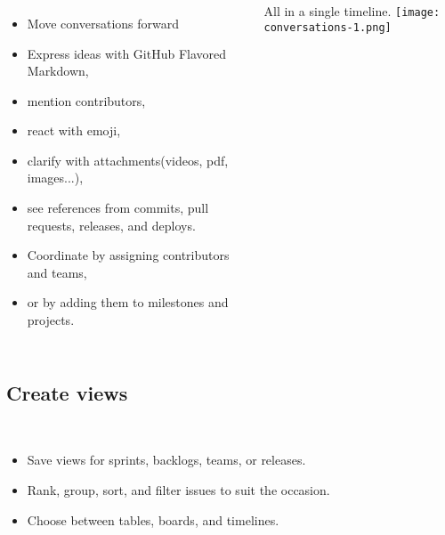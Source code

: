\begin{frame}
  \frametitle{\insertsectionhead}
  \framesubtitle{\insertsubsectionhead}
  \begin{columns}
    \scriptsize
    \begin{itemize}
      \item Move conversations forward
      \item Express ideas with GitHub Flavored Markdown, 
      \item mention contributors, 
      \item react with emoji, 
      \item clarify with attachments(videos, pdf, images...), 
      \item see references from commits, pull requests, releases, and deploys. 
      \item Coordinate by assigning contributors and teams, 
      \item or by adding them to milestones and projects. 
    \end{itemize}
    \centering\vspace{1cm}
    \alert{All in a single timeline.}
    \texttt{[image: conversations-1.png]}
  \end{columns}

\end{frame}

\subsection{Create views}
\begin{frame}
  \frametitle{\insertsectionhead}
  \framesubtitle{\insertsubsectionhead}
  \begin{columns}
    \begin{itemize}
      \item Save views for sprints, backlogs, teams, or releases. 
      \item Rank, group, sort, and filter issues to suit the occasion. 
      \item Choose between tables, boards, and timelines.
    \end{itemize}
  \end{columns}

\end{frame}

